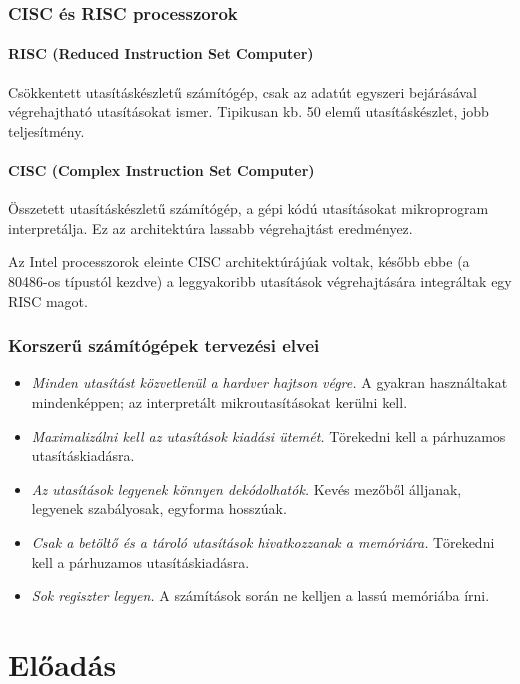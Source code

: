 \documentclass[10pt]{article}
\begin{document}
\subsubsection{CISC és RISC processzorok}

\paragraph{RISC (Reduced Instruction Set Computer)} Csökkentett utasításkészletű számítógép, csak az adatút egyszeri bejárásával végrehajtható utasításokat ismer. Tipikusan kb. 50 elemű utasításkészlet, jobb teljesítmény.

\paragraph{CISC (Complex Instruction Set Computer)} Összetett utasításkészletű számítógép, a gépi kódú utasításokat mikroprogram interpretálja. Ez az architektúra lassabb végrehajtást eredményez.

Az Intel processzorok eleinte CISC architektúrájúak voltak, később ebbe (a 80486-os típustól kezdve) a leggyakoribb utasítások végrehajtására integráltak egy RISC magot.

\subsubsection{Korszerű számítógépek tervezési elvei}

\begin{itemize}
	\item \emph{Minden utasítást közvetlenül a hardver hajtson végre.} A gyakran használtakat mindenképpen; az interpretált mikroutasításokat kerülni kell.
	\item \emph{Maximalizálni kell az utasítások kiadási ütemét.} Törekedni kell a párhuzamos utasításkiadásra.
	\item \emph{Az utasítások legyenek könnyen dekódolhatók.} Kevés mezőből álljanak, legyenek szabályosak, egyforma hosszúak.
	\item \emph{Csak a betöltő és a tároló utasítások hivatkozzanak a memóriára.} Törekedni kell a párhuzamos utasításkiadásra.
	\item \emph{Sok regiszter legyen.} A számítások során ne kelljen a lassú memóriába írni.
\end{itemize}

\section{Előadás}
\end{document}
